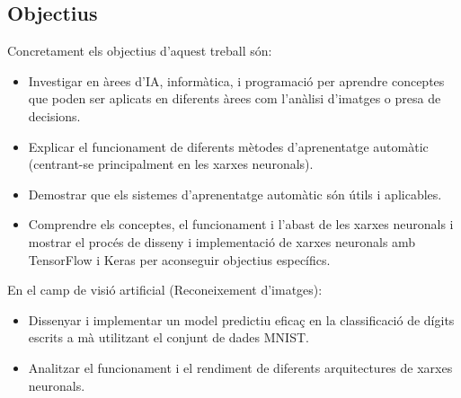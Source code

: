 \begin{refsection}
	\section{Objectius}

	Concretament els objectius d'aquest treball són:

	\begin{itemize}

		\item Investigar en àrees d'IA, informàtica, i programació per aprendre conceptes que poden ser aplicats en diferents àrees com l'anàlisi d'imatges o presa de decisions.

		\item Explicar el funcionament de diferents mètodes d'aprenentatge automàtic (centrant-se principalment en les xarxes neuronals).

		\item Demostrar que els sistemes d'aprenentatge automàtic són útils i aplicables.

		\item Comprendre els conceptes, el funcionament i l'abast de les xarxes neuronals i mostrar el procés de disseny i implementació de xarxes neuronals amb TensorFlow i Keras per aconseguir objectius específics.

	\end{itemize}

	En el camp de visió artificial (Reconeixement d'imatges):

	\begin{itemize}

		\item Dissenyar i implementar un model predictiu eficaç en la classificació de dígits escrits a mà utilitzant el conjunt de dades MNIST.

		\item Analitzar el funcionament i el rendiment de diferents arquitectures de xarxes neuronals.

	\end{itemize}

	\begin{comment}

	Videojocs (presa de decisions):

	\begin{itemize}

		\item Adaptar la metodologia d'aprenentatge per reforçament d'AlphaZero de Google DeepMind per a jocs com connecta 4 o gomoku.


\end{comment}
\end{refsection}
